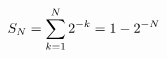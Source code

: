 \documentclass[preview]{standalone}
\begin{document}
\begin{align*}
\special{dvisvgm:raw <g id='unique000'>}S_N=\sum_{k=1}^N2^{-k}=1-2^{-N}\special{dvisvgm:raw </g>}
\end{align*}
\end{document}
